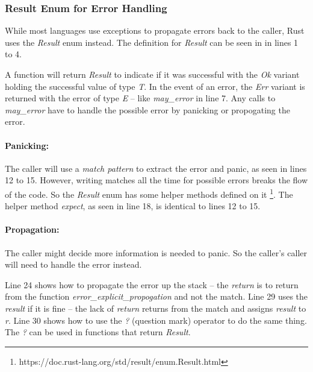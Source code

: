 \subsubsection{Result Enum for Error Handling}
\label{sec:result-enum}
While most languages use exceptions to propagate errors back to the caller, Rust uses the \textit{Result} enum instead.
The definition for \textit{Result} can be seen in  in lines 1 to 4.


A function will return \textit{Result} to indicate if it was successful with the \textit{Ok} variant holding the successful value of type \textit{T}.
In the event of an error, the \textit{Err} variant is returned with the error of type \textit{E} -- like \textit{may\_error} in line 7.
Any calls to \textit{may\_error} have to handle the possible error by panicking or propogating the error.

\paragraph{Panicking:}
The caller will use a \textit{match pattern} to extract the error and panic, as seen in lines 12 to 15.
However, writing matches all the time for possible errors breaks the flow of the code.
So the \textit{Result} enum has some helper methods defined on it \footnote{https://doc.rust-lang.org/std/result/enum.Result.html}.
The helper method \textit{expect}, as seen in line 18, is identical to lines 12 to 15.

\paragraph{Propagation:}
The caller might decide more information is needed to panic.
So the caller's caller will need to handle the error instead.

Line 24 shows how to propagate the error up the stack -- the \textit{return} is to return from the function \textit{error\_explicit\_propogation} and not the match.
Line 29 uses the \textit{result} if it is fine -- the lack of \textit{return} returns from the match and assigns \textit{result} to \textit{r}.
Line 30 shows how to use the \textit{?} (question mark) operator to do the same thing.
The \textit{?} can be used in functions that return \textit{Result}.


